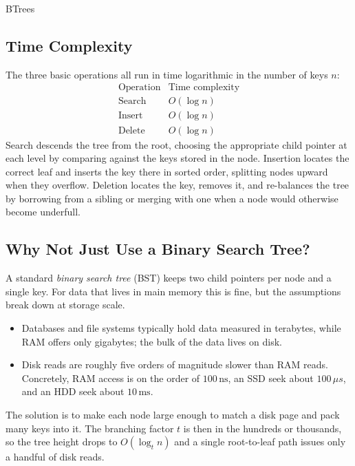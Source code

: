 \documentclass[hidelinks]{article}
\begin{document}
\begin{smodule}[title={B-Trees}]{BTrees}
\subsection{Time Complexity}

The three basic operations all run in time logarithmic in the number of keys $n$:
\[
\begin{array}{l|l}
\text{Operation} & \text{Time complexity}\\
\hline
\text{Search} & O(\log n)\\
\text{Insert} & O(\log n)\\
\text{Delete} & O(\log n)
\end{array}
\]
Search descends the tree from the root, choosing the appropriate child pointer at each level by comparing against the keys stored in the node. Insertion locates the correct leaf and inserts the key there in sorted order, splitting nodes upward when they overflow. Deletion locates the key, removes it, and re-balances the tree by borrowing from a sibling or merging with one when a node would otherwise become underfull.

\subsection{Why Not Just Use a Binary Search Tree?}

A standard \emph{binary search tree} (BST) keeps two child pointers per node and a single key. For data that lives in main memory this is fine, but the assumptions break down at storage scale.

\begin{itemize}
  \item Databases and file systems typically hold data measured in terabytes, while RAM offers only gigabytes; the bulk of the data lives on disk.
  \item Disk reads are roughly five orders of magnitude slower than RAM reads. Concretely, RAM access is on the order of $100\,\text{ns}$, an SSD seek about $100\,\mu s$, and an HDD seek about $10\,\text{ms}$.
\end{itemize}

The  solution is to make each node large enough to match a disk page and pack many keys into it. The branching factor $t$ is then in the hundreds or thousands, so the tree height drops to $O(\log_t n)$ and a single root-to-leaf path issues only a handful of disk reads.


\end{smodule}
\end{document}
